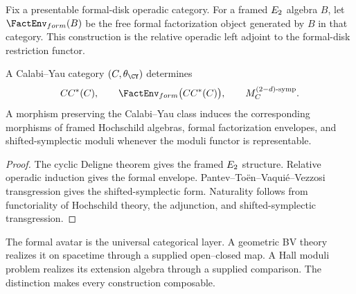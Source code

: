 \begin{definition}
Fix a presentable formal-disk operadic category.  For a framed $E_2$ algebra $B$, let $\FactEnv_{\mathrm{form}}(B)$ be the free formal factorization object generated by $B$ in that category.  This construction is the relative operadic left adjoint to the formal-disk restriction functor.
\end{definition}

\begin{theorem}
A Calabi--Yau category $(\Ccal,\theta_{\CY})$ determines
\[
 CC^*(\Ccal),
 \qquad
 \FactEnv_{\mathrm{form}}\bigl(CC^*(\Ccal)\bigr),
 \qquad
 \M_{\Ccal}^{(2-d)\text{-symp}}.
\]
A morphism preserving the Calabi--Yau class induces the corresponding morphisms of framed Hochschild algebras, formal factorization envelopes, and shifted-symplectic moduli whenever the moduli functor is representable.
\end{theorem}
\begin{proof}
The cyclic Deligne theorem gives the framed $E_2$ structure.  Relative operadic induction gives the formal envelope.  Pantev--To\"en--Vaqui\'e--Vezzosi transgression gives the shifted-symplectic form.  Naturality follows from functoriality of Hochschild theory, the adjunction, and shifted-symplectic transgression.
\end{proof}

The formal avatar is the universal categorical layer.  A geometric BV theory realizes it on spacetime through a supplied open--closed map.  A Hall moduli problem realizes its extension algebra through a supplied comparison.  The distinction makes every construction composable.

